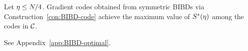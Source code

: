 \documentclass[conference,letterpaper]{IEEEtran}
\begin{document}
\begin{proposition}
\label{prop:BIBD-optimal}
Let $\eta \leq N/4$. 
Gradient codes obtained from symmetric BIBDs via Construction~\ref{con:BIBD-code} achieve the maximum value of $S^{*}(\eta)$ among the codes in $\mathcal{C}$.
\end{proposition}
\begin{IEEEproof}
See Appendix~\ref{app:BIBD-optimal}.
\end{IEEEproof}















\appendices
\end{document}
